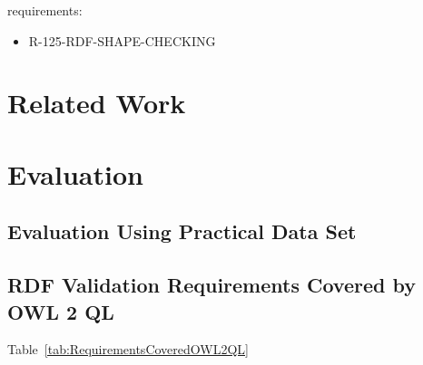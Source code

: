 \documentclass{llncs}
\begin{document}
requirements:

\begin{itemize}
	\item R-125-RDF-SHAPE-CHECKING
\end{itemize}



\section{Related Work}



\section{Evaluation}



\subsection{Evaluation Using Practical Data Set}



\subsection{RDF Validation Requirements Covered by OWL 2 QL}

Table~\ref{tab:RequirementsCoveredOWL2QL}
\end{document}
